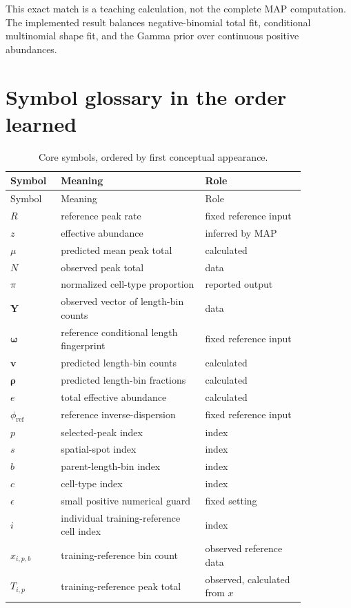 \documentclass[11pt]{article}
\begin{document}
\begin{watchout}
This exact match is a teaching calculation, not the complete MAP computation.
The implemented result balances negative-binomial total fit, conditional
multinomial shape fit, and the Gamma prior over continuous positive abundances.
\end{watchout}

\section{Symbol glossary in the order learned}

\begin{longtable}{C{0.12\linewidth}L{0.43\linewidth}L{0.30\linewidth}}
\caption{Core symbols, ordered by first conceptual appearance.}\label{tab:glossary}\\
\toprule
Symbol & Meaning & Role \\
\midrule
\endfirsthead
\toprule
Symbol & Meaning & Role \\
\midrule
\endhead
\(R\) & reference peak rate & fixed reference input \\
\(z\) & effective abundance & inferred by MAP \\
\(\mu\) & predicted mean peak total & calculated \\
\(N\) & observed peak total & data \\
\(\pi\) & normalized cell-type proportion & reported output \\
\(\boldsymbol Y\) & observed vector of length-bin counts & data \\
\(\boldsymbol\omega\) & reference conditional length fingerprint & fixed reference input \\
\(\boldsymbol v\) & predicted length-bin counts & calculated \\
\(\boldsymbol\rho\) & predicted length-bin fractions & calculated \\
\(e\) & total effective abundance & calculated \\
\(\phi_{\mathrm{ref}}\) & reference inverse-dispersion & fixed reference input \\
\(p\) & selected-peak index & index \\
\(s\) & spatial-spot index & index \\
\(b\) & parent-length-bin index & index \\
\(c\) & cell-type index & index \\
\(\epsilon\) & small positive numerical guard & fixed setting \\
\(i\) & individual training-reference cell index & index \\
\(x_{i,p,b}\) & training-reference bin count & observed reference data \\
\(T_{i,p}\) & training-reference peak total & observed, calculated from \(x\) \\
\bottomrule
\end{longtable}
\end{document}
